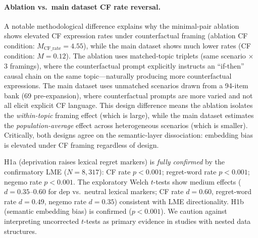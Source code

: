 \documentclass[conference,10pt]{IEEEtran}
\begin{document}
\paragraph{Ablation vs.\ main dataset CF rate reversal.}
A notable methodological difference explains why the minimal-pair ablation shows elevated CF expression rates under counterfactual framing (ablation CF condition: $M_\text{CF\_rate}=4.55$), while the main dataset shows much lower rates (CF condition: $M=0.12$). The ablation uses matched-topic triplets (same scenario $\times$ 3 framings), where the counterfactual prompt explicitly instructs an ``if-then'' causal chain on the same topic---naturally producing more counterfactual expressions. The main dataset uses unmatched scenarios drawn from a 94-item bank (69 pre-expansion), where counterfactual prompts are more varied and not all elicit explicit CF language. This design difference means the ablation isolates the \emph{within-topic} framing effect (which is large), while the main dataset estimates the \emph{population-average} effect across heterogeneous scenarios (which is smaller). Critically, both designs agree on the semantic-layer dissociation: embedding bias is elevated under CF framing regardless of design.

H1a (deprivation raises lexical regret markers) is \textit{fully confirmed} by the confirmatory LME ($N=8{,}317$): CF rate $p<0.001$; regret-word rate $p<0.001$; negemo rate $p<0.001$. The exploratory Welch $t$-tests show medium effects ($d=0.35$--$0.60$ for dep vs.\ neutral lexical markers; CF rate $d=0.60$, regret-word rate $d=0.49$, negemo rate $d=0.35$) consistent with LME directionality. H1b (semantic embedding bias) is confirmed ($p<0.001$). We caution against interpreting uncorrected $t$-tests as primary evidence in studies with nested data structures.
\end{document}
